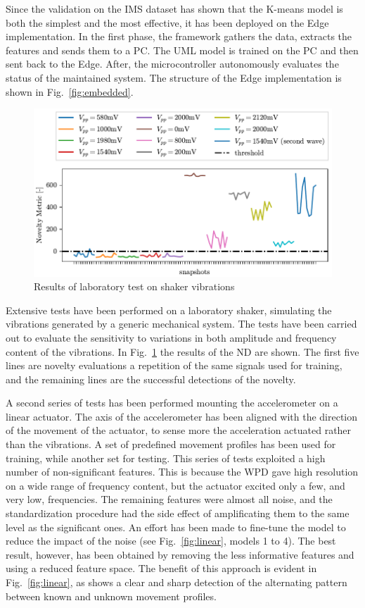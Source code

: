 Since the validation on the IMS dataset has shown that the K-means model is both the simplest and the most effective, it has been deployed on the Edge implementation. In the first phase, the framework gathers the data, extracts the features and sends them to a PC. The UML model is trained on the PC and then sent back to the Edge. After, the microcontroller autonomously evaluates the status of the maintained system. The structure of the Edge implementation is shown in Fig.~\ref{fig:embedded}.

\begin{figure}
    \includegraphics[width=\linewidth]{images/Test02_LOF.pdf}
    \caption{Results of laboratory test on shaker vibrations}
    \label{fig:shaker}
\end{figure}

Extensive tests have been performed on a laboratory shaker, simulating the vibrations generated by a generic mechanical system. The tests have been carried out to evaluate the sensitivity to variations in both amplitude and frequency content of the vibrations. In Fig.~\ref{fig:shaker} the results of the ND are shown. The first five lines are novelty evaluations a repetition of the same signals used for training, and the remaining lines are the successful detections of the novelty.

A second series of tests has been performed mounting the accelerometer on a linear actuator. The axis of the accelerometer has been aligned with the direction of the movement of the actuator, to sense more the acceleration actuated rather than the vibrations. A set of predefined movement profiles has been used for training, while another set for testing. This series of tests exploited a high number of non-significant features. This is because the WPD gave high resolution on a wide range of frequency content, but the actuator excited only a few, and very low, frequencies. The remaining features were almost all noise, and the standardization procedure had the side effect of amplificating them to the same level as the significant ones. An effort has been made to fine-tune the model to reduce the impact of the noise (see Fig.~\ref{fig:linear}, models 1 to 4). The best result, however, has been obtained by removing the less informative features and using a reduced feature space. The benefit of this approach is evident in Fig.~\ref{fig:linear}, as  shows a clear and sharp detection of the alternating pattern between known and unknown movement profiles.


